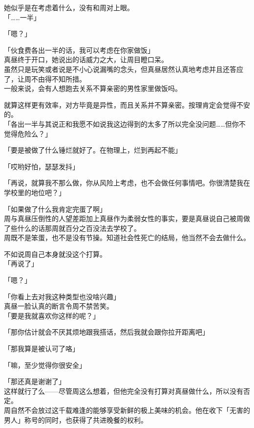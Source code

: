她似乎是在考虑着什么，没有和周对上眼。\\

「……一半」

「嗯？」

「伙食费各出一半的话，我可以考虑在你家做饭」\\

真昼终于开口，她说出的话威力之大，让周目瞪口呆。\\

虽然只是玩笑或者说是不小心说漏嘴的念头，但真昼居然认真地考虑并且还答应了，让周不由得不知所措。\\

一般来说，会有人想跑去关系不算亲密的男性家里做饭吗。

就算这样更有效率，对方毕竟是异性，而且关系并不算亲密。按理肯定会觉得不安的。\\

「各出一半与其说正和我愿不如说我这边得到的太多了所以完全没问题……但你不觉得危险么？」

「要是被做了什么锤烂就好了。在物理上，烂到再起不能」

「哎哟好怕，瑟瑟发抖」

「再说，就算我不那么做，你从风险上考虑，也不会做任何事情吧。你很清楚我在学校里的地位吧？」

「如果做了什么我肯定完蛋了啊」\\

周与真昼压倒性的人望差距加上真昼作为柔弱女性的事实，要是真昼说自己被周做了些什么的话那周就百分之百没法去学校了。\\

周既不是笨蛋，也不是没有节操。知道社会性死亡的结局，他当然不会去做什么。

不如说周自己本身就没这个打算。\\

「再说了」

「嗯？」

「你看上去对我这种类型也没啥兴趣」\\

真昼一脸认真的断言令周不禁苦笑。\\

「要是我就喜欢你这样的呢？」

「那你估计就会不厌其烦地跟我搭话，然后我就会跟你拉开距离吧」

「那我算是被认可了咯」

「嘛，至少觉得你很安全」

「那还真是谢谢了」\\

这样就行了么——尽管周这么想着，但他完全没有打算对真昼做什么，所以没有否定。\\

周自然不会放过这千载难逢的能够享受新鲜的极上美味的机会。他在收下「无害的男人」称号的同时，也获得了共进晚餐的权利。
